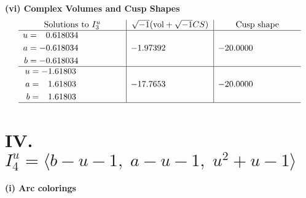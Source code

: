 \documentclass[1p]{elsarticle_modified}
\theoremstyle{definition}
\newcommand{\I}{\sqrt{-1}}
\begin{document}
\newpage\flushleft \textbf{(vi) Complex Volumes and Cusp Shapes}
$$\begin{array}{c|c|c}  
\text{Solutions to }I^u_{3}& \I (\text{vol} + \sqrt{-1}CS) & \text{Cusp shape}\\
 \hline 
\begin{aligned}
u &= \phantom{-}0.618034\phantom{ +0.000000I} \\
a &= -0.618034\phantom{ +0.000000I} \\
b &= -0.618034\phantom{ +0.000000I}\end{aligned}
 & -1.97392\phantom{ +0.000000I} & -20.0000\phantom{ +0.000000I} \\ \hline\begin{aligned}
u &= -1.61803\phantom{ +0.000000I} \\
a &= \phantom{-}1.61803\phantom{ +0.000000I} \\
b &= \phantom{-}1.61803\phantom{ +0.000000I}\end{aligned}
 & -17.7653\phantom{ +0.000000I} & -20.0000\phantom{ +0.000000I}\\
 \hline 
 \end{array}$$\newpage\newpage\renewcommand{\arraystretch}{1}
\centering \section*{IV. $I^u_{4}= \langle b- u-1,\;a- u-1,\;u^2+u-1 \rangle$}
\flushleft \textbf{(i) Arc colorings}\\
\end{document}
